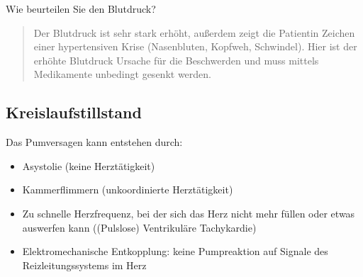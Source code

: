 Wie beurteilen Sie den Blutdruck? 

\begin{quote}
Der Blutdruck ist sehr stark erhöht, außerdem zeigt die
Patientin Zeichen einer hypertensiven Krise (Nasenbluten, Kopfweh, Schwindel).
Hier ist der erhöhte Blutdruck Ursache für die Beschwerden und muss
mittels Medikamente unbedingt gesenkt werden. 
\end{quote}



\subsection{Kreislaufstillstand}\label{bkm:RefHeading42514602}\label{topic:kreislaufstillstand}


Das Pumversagen kann entstehen durch:

\begin{itemize}
    \item Asystolie (keine Herztätigkeit)
    \item Kammerflimmern (unkoordinierte Herztätigkeit)
    \item Zu schnelle Herzfrequenz, bei der sich das Herz
    nicht mehr füllen oder etwas auswerfen kann ((Pulslose) Ventrikuläre Tachykardie)
    \item Elektromechanische Entkopplung: keine
    Pumpreaktion auf Signale des Reizleitungssystems im Herz
\end{itemize}

